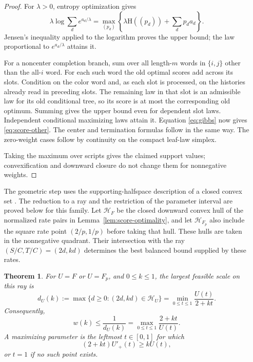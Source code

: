 \documentclass[11pt]{article}
\numberwithin{equation}{section}
\newtheorem{theorem}{Theorem}[section]
\theoremstyle{definition}
\theoremstyle{remark}
\newcommand{\HH}{\mathrm H}
\newcommand{\calH}{\mathcal H}
\begin{document}
\begin{proof}
For \(\lambda>0\), entropy optimization gives
\begin{equation}\label{eq:gibbs}
 \lambda\log\sum_d e^{a_d/\lambda}
  =\max_{(p_d)}
     \left\{\lambda\HH((p_d))+\sum_d p_d a_d\right\}.
\end{equation}
Jensen's inequality applied to the logarithm proves the upper bound;
the law proportional to \(e^{a_d/\lambda}\) attains it.

For a noncenter completion branch, sum over all length-\(m\)
words in \(\{i,j\}\) other than the all-\(i\) word.
For each such word the old optimal scores add across its slots.
Condition on the color word and, as each slot is processed, on the
histories already read in preceding slots.  The remaining law in
that slot is an admissible law for its old conditional tree, so its
score is at most the corresponding old optimum.  Summing gives the
upper bound even for dependent slot laws.  Independent conditional
maximizing laws attain it.
Equation \eqref{eq:gibbs} now gives \eqref{eq:score-other}.
The center and termination formulas follow in the same way.
The zero-weight cases follow by continuity on the compact leaf-law
simplex.

Taking the maximum over scripts gives the claimed support values;
convexification and downward closure do not change them for
nonnegative weights.
\end{proof}

The geometric step uses the supporting-halfspace description of a
closed convex set \cite[Theorem~8.24]{rockafellar-wets}.  The reduction
to a ray and the restriction of the parameter interval are proved
below for this family.  Let \(\calH_F\) be the closed downward convex
hull of the normalized rate pairs in Lemma~\ref{lem:score-optimality},
and let \(\calH_{F_p}\) also include the square rate point
\((2/p,1/p)\) before taking that hull.  These hulls are taken in the
nonnegative quadrant.  Their intersection with the ray
\((S/C,T/C)=(2d,kd)\) determines the best balanced bound supplied by
these rates.

\begin{theorem}\label{thm:shape-optimization}
For \(U=F\) or \(U=F_p\), and \(0\le k\le1\),
the largest feasible scale on this ray is
\begin{equation}\label{eq:radial-optimum}
 d_U(k):=\max\{d\ge0:(2d,kd)\in\calH_U\}
       =\min_{0\le t\le1}\frac{U(t)}{2+kt}.
\end{equation}
Consequently,
\begin{equation}\label{eq:functional-bound}
 w(k)\le\frac1{d_U(k)}
      =\max_{0\le t\le1}\frac{2+kt}{U(t)}.
\end{equation}
A maximizing parameter is the leftmost \(t\in[0,1]\) for which
\begin{equation}\label{eq:contact-rule}
 (2+kt)U'_+(t)\ge kU(t),
\end{equation}
or \(t=1\) if no such point exists.
\end{theorem}
\end{document}

